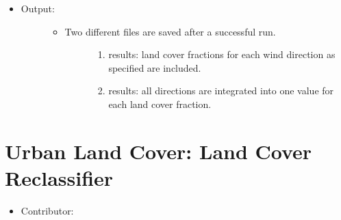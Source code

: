 \documentclass[letterpaper,10pt,english]{sphinxmanual}
\begin{document}
\begin{itemize}
\begin{description}
\begin{itemize}
\end{itemize}

\end{description}

\item {} \begin{description}
\item[{Output:}] \leavevmode\begin{itemize}
\item {} \begin{description}
\item[{Two different files are saved after a successful run.}] \leavevmode\begin{enumerate}
\item {} 
 results: land cover fractions for each wind direction as specified are included.

\item {} 
 results: all directions are integrated into one value for each land cover fraction.

\end{enumerate}

\end{description}

\end{itemize}

\end{description}

\end{itemize}


\section{Urban Land Cover: Land Cover Reclassifier}
\label{\detokenize{pre-processor/Urban Land Cover Land Cover Reclassifier:urban-land-cover-land-cover-reclassifier}}\label{\detokenize{pre-processor/Urban Land Cover Land Cover Reclassifier:landcoverreclassifier}}\label{\detokenize{pre-processor/Urban Land Cover Land Cover Reclassifier::doc}}\begin{itemize}
\item {} 
Contributor:

\end{itemize}
\end{document}
